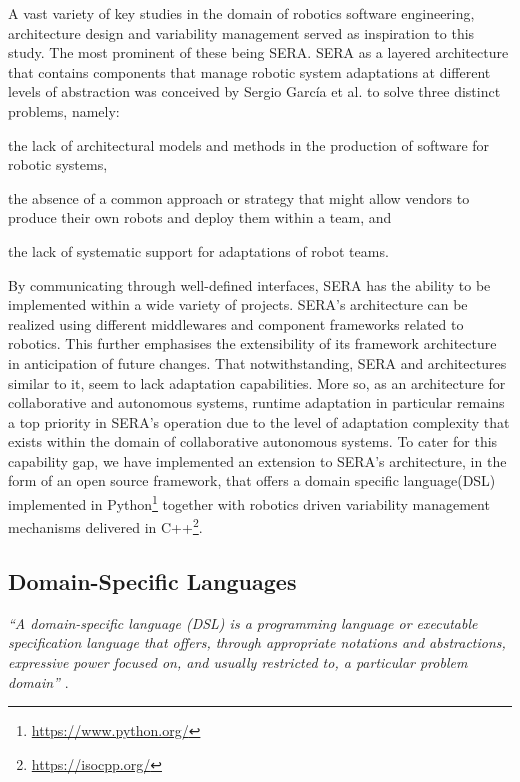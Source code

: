 \documentclass[conference]{IEEEtran}
\newcommand{\foot}[1]{\footnote{\url{#1}}}
\begin{document}
A vast variety of key studies in the domain of robotics software engineering, architecture design and variability management served as inspiration to this study. The most prominent of these being SERA. SERA as a layered architecture that contains components that manage robotic system adaptations at different levels of abstraction was conceived by Sergio Garc\'{i}a et al. \cite{sera} to solve three distinct problems, namely:
\begin{enumerate*}[label=(\roman*)]
	\item the lack of architectural models and methods in the production of software for robotic systems,
	\item the absence of a common approach or strategy that might allow vendors to produce their own robots and deploy them within a team, and
	\item the lack of systematic support for adaptations of robot teams.
\end{enumerate*}

By communicating through well-defined interfaces, SERA has the ability to be implemented within a wide variety of projects. SERA's architecture can be realized using different middlewares and component frameworks related to robotics. This further emphasises the extensibility of its framework architecture in anticipation of future changes.
That notwithstanding, SERA and architectures similar to it, seem to lack adaptation capabilities. More so, as an architecture for collaborative and autonomous systems, runtime adaptation in particular remains a top priority in SERA's operation due to the level of adaptation complexity that exists within the domain of collaborative autonomous systems. To cater for this capability gap, we have implemented an extension to SERA's architecture, in the form of an open source framework, that offers a domain specific language(DSL) implemented in Python\foot{https://www.python.org/} together with robotics driven variability management mechanisms delivered in C++\foot{https://isocpp.org/}.

\subsection{Domain-Specific Languages}
\textit{``A domain-specific language (DSL) is a programming language or executable specification language that offers, through appropriate notations and abstractions, expressive power focused on, and usually restricted to, a particular problem domain''} \cite{dsl}.
\end{document}

